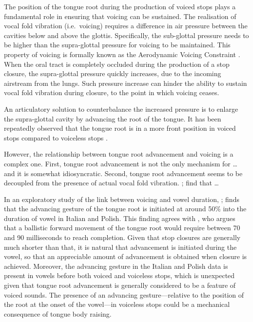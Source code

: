 \documentclass[preprint]{JASAnew}
\begin{document}
The position of the tongue root during the production of voiced stops
plays a fundamental role in ensuring that voicing can be sustained. The
realisation of vocal fold vibration (i.e.~voicing) requires a difference
in air pressure between the cavities below and above the glottis.
Specifically, the sub-glottal pressure needs to be higher than the
supra-glottal pressure for voicing to be maintained. This property of
voicing is formally known as the Aerodynamic Voicing Constraint
\citep{ohala2011}. When the oral tract is completely occluded during the
production of a stop closure, the supra-glottal pressure quickly
increases, due to the incoming airstream from the lungs. Such pressure
increase can hinder the ability to sustain vocal fold vibration during
closure, to the point in which voicing ceases.

An articulatory solution to counterbalance the increased pressure is to
enlarge the supra-glottal cavity by advancing the root of the tongue. It
has been repeatedly observed that the tongue root is in a more front
position in voiced stops compared to voiceless stops
\citep{kent1969, perkell1969, westbury1983}.

However, the relationship between tongue root advancement and voicing is
a complex one. First, tongue root advancement is not the only mechanism
for \ldots{} and it is somewhat idiosyncratic. Second, tongue root
advancement seems to be decoupled from the presence of actual vocal fold
vibration. \citet{ahn2015}; \citet{ahn2016} find that \ldots{}

In an exploratory study of the link between voicing and vowel duration,
\citet{coretta2018f}; \citet{coretta2018d} finds that the advancing
gesture of the tongue root is initiated at around 50\% into the duration
of vowel in Italian and Polish. This finding agrees with
\citet{rothenberg1967}, who argues that a ballistic forward movement of
the tongue root would require between 70 and 90 milliseconds to reach
completion. Given that stop closures are generally much shorter than
that, it is natural that advancement is initiated during the vowel, so
that an appreciable amount of advancement is obtained when closure is
achieved. Moreover, the advancing gesture in the Italian and Polish data
is present in vowels before both voiced and voiceless stops, which is
unexpected given that tongue root advancement is generally considered to
be a feature of voiced sounds. The presence of an advancing
gesture---relative to the position of the root at the onset of the
vowel---in voiceless stops could be a mechanical consequence of tongue
body raising.
\end{document}
